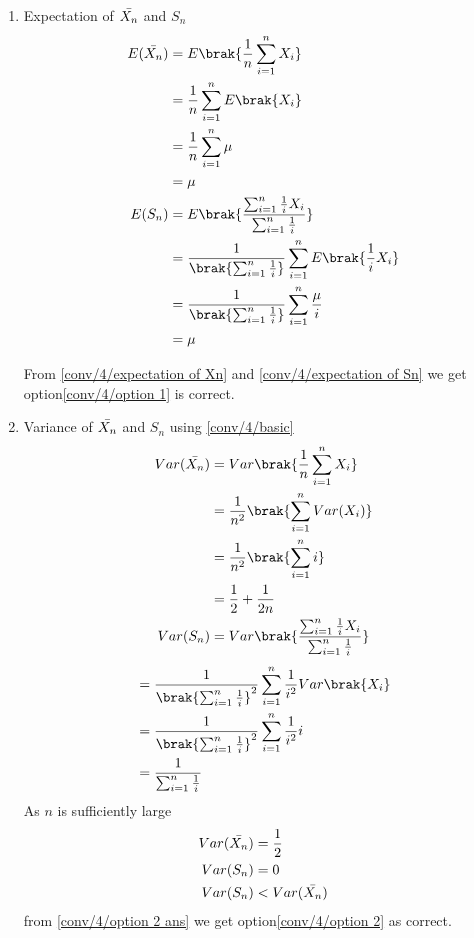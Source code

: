  
\begin{enumerate}
    \item Expectation of $\Bar{X_{n}}$ and $S_{n}$
    \begin{align}
    E(\Bar{X_{n}}) &= E\brak{\frac{1}{n}\sum_{i=1}^{n}X_{i}}\\
                   &= \frac{1}{n}\sum_{i=1}^{n}E\brak{X_{i}}\\
                   &= \frac{1}{n}\sum_{i=1}^{n}\mu\\
                   &= \mu \label{conv/4/expectation of Xn}\\
      E(S_{n}) &= E\brak{\frac{\sum_{i=1}^{n}\frac{1}{i}X_{i}}{\sum_{i=1}^{n}\frac{1}{i}}}      \\
               &= \frac{1}{\brak{\sum_{i=1}^{n}\frac{1}{i}}}\sum_{i=1}^{n}E\brak{\frac{1}{i}X_{i}}\\
               &= \frac{1}{\brak{\sum_{i=1}^{n}\frac{1}{i}}}\sum_{i=1}^{n}\frac{\mu}{i}\\
               &= \mu   \label{conv/4/expectation of Sn}
   \end{align}
   
   From \eqref{conv/4/expectation of Xn} and \eqref{conv/4/expectation of Sn} we get option\eqref{conv/4/option 1} is correct.
   
   \item 
    Variance of $\Bar{X_{n}}$ and $S_{n}$ using \eqref{conv/4/basic}
    \begin{align}
    Var(\Bar{X_{n}})&= Var\brak{\frac{1}{n}\sum_{i=1}^{n}X_{i}}\\
                   &= \frac{1}{n^{2}}\brak{\sum_{i=1}^{n}Var(X_{i})}\\
                   &= \frac{1}{n^{2}}\brak{\sum_{i=1}^{n}i}\\
                   &= \frac{1}{2} + \frac{1}{2n}\label{conv/4/variance of Xn}\\
    Var(S_{n}) &= Var\brak{\frac{\sum_{i=1}^{n}\frac{1}{i}X_{i}}{\sum_{i=1}^{n} \frac{1}{i}}}
    \end{align}
    \begin{align}
               &= \frac{1}{\brak{\sum_{i=1}^{n}\frac{1}{i}}^{2}}\sum_{i=1}^{n}\frac{1}{i^{2}}Var\brak{X_{i}}\\
               &= \frac{1}{\brak{\sum_{i=1}^{n}\frac{1}{i}}^{2}}\sum_{i=1}^{n}\frac{1}{i^{2}}i\\
               &= \frac{1}{\sum_{i=1}^{n}\frac{1}{i}}\label{conv/4/Variance of Sn}
   \end{align}
   As $n$ is sufficiently large 
   \begin{align}
       Var(\Bar{X_{n}}) &= \frac{1}{2}\\
       Var(S_{n})       &= 0\\
       Var(S_{n}) &< Var(\Bar{X_{n}})\label{conv/4/option 2 ans}
   \end{align}
   from \eqref{conv/4/option 2 ans} we get option\eqref{conv/4/option 2} as correct.
   

\end{enumerate}
